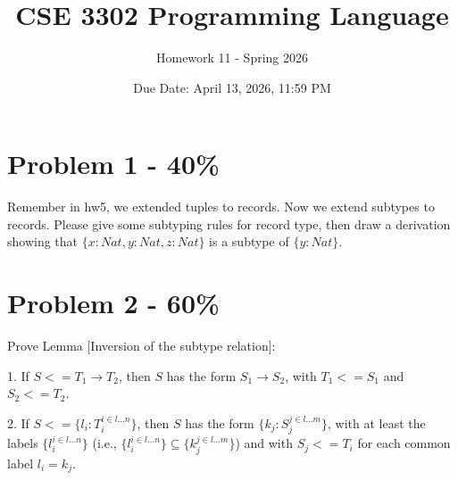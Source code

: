 \documentclass{article}
\begin{document}
\title{CSE 3302 Programming Language}
\author{Homework 11 - Spring 2026}
\date{Due Date: April 13, 2026, 11:59 PM}
\maketitle
\thispagestyle{fancy}


\section*{Problem 1 - 40\%}

Remember in hw5, we extended tuples to records. Now we extend subtypes to records. Please give some subtyping rules for record type, then draw a derivation showing that $\{x:Nat, y:Nat, z:Nat\}$ is a subtype of $\{y:Nat\}$.



\section*{Problem 2 - 60\%}

Prove Lemma [Inversion of the subtype relation]:
	
	1. If $S <= T_1 \rightarrow T_2$, then $S$ has the form $S_1 \rightarrow S_2$, with $T_1 <= S_1$ and $S_2 <= T_2$.
	
	2. If $S <= \{l_i:T_i^{i \in l...n}\}$, then $S$ has the form $\{k_j:S_j^{j \in l...m}\}$, with at least the labels $\{l_i^{i \in l...n}\}$ (i.e., $\{l_i^{i \in l...n}\} \subseteq \{k_j^{j \in l...m}\}$) and with $S_j <= T_i$ for each common label $l_i=k_j$.


\vspace{20pt}
\vspace{0.8em}
\end{document}
